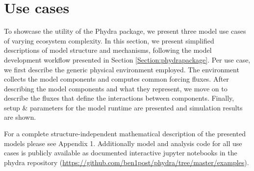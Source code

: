 \documentclass[template.tex]{subfiles}
\begin{document}
\section{Use cases} \label{Section:UseCases}

To showcase the utility of the Phydra package, we present three model use cases of varying ecosystem complexity. In this section, we present simplified descriptions of model structure and mechanisms, following the model development workflow presented in Section \ref{Section:phydrapackage}.
Per use case, we first describe the generic physical environment employed. The environment collects the model components and computes common forcing fluxes. After describing the model components and what they represent, we move on to describe the fluxes that define the interactions between components. Finally, setup \& parameters for the model runtime are presented and simulation results are shown.

For a complete structure-independent mathematical description of the presented models please see Appendix 1. Additionally model and analysis code for all use cases is publicly available as documented interactive jupyter notebooks in the phydra repository (\url{https://github.com/ben1post/phydra/tree/master/examples}). \\
\end{document}
